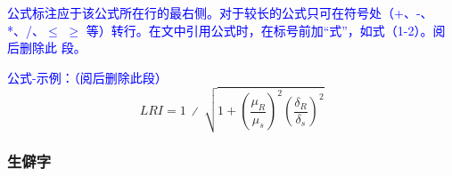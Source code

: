\textcolor{blue}{公式标注应于该公式所在行的最右侧。对于较长的公式只可在符号处（+、-、*、/、$\leqslant$ $\geqslant$ 等）转行。在文中引用公式时，在标号前加“式”，如式（1-2）。阅后删除此
段。}

\textcolor{blue}{公式-示例：（阅后删除此段）}
\begin{equation}
    LRI=1\ ∕\ \sqrt{1+{\left(\frac{{\mu }_{R}}{{\mu }_{s}}\right)}^{2}{\left(\frac{{\delta }_{R}}{{\delta }_{s}}\right)}^{2}}
\end{equation}

\subsubsection{生僻字}




